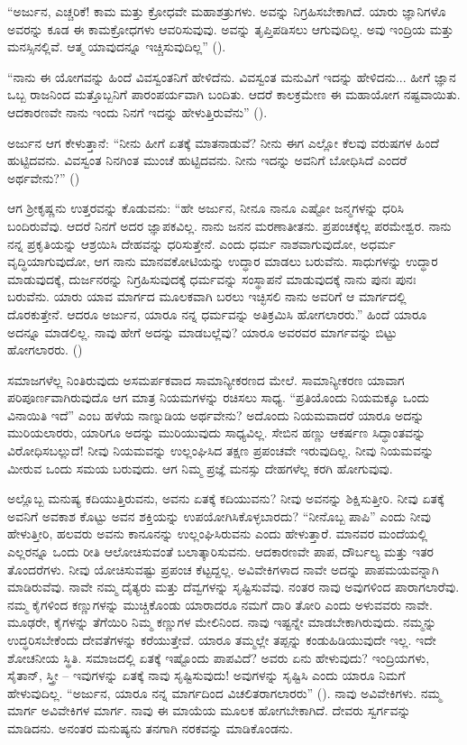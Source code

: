 “ಅರ್ಜುನ, ಎಚ್ಚರಿಕೆ! ಕಾಮ ಮತ್ತು ಕ್ರೋಧವೇ ಮಹಾಶತ್ರುಗಳು. ಅವನ್ನು ನಿಗ್ರಹಿಸಬೇಕಾಗಿದೆ. ಯಾರು ಜ್ಞಾನಿಗಳೊ ಅವರನ್ನು ಕೂಡ ಈ ಕಾಮಕ್ರೋಧಗಳು ಆವರಿಸುವುವು. ಅವನ್ನು ತೃಪ್ತಿಪಡಿಸಲು ಆಗುವುದಿಲ್ಲ. ಅವು ಇಂದ್ರಿಯ ಮತ್ತು ಮನಸ್ಸಿನಲ್ಲಿವೆ. ಆತ್ಮ ಯಾವುದನ್ನೂ ಇಚ್ಚಿಸುವುದಿಲ್ಲ” ().

“ನಾನು ಈ ಯೋಗವನ್ನು ಹಿಂದೆ ವಿವಸ್ವಂತನಿಗೆ ಹೇಳಿದೆನು. ವಿವಸ್ವಂತ ಮನುವಿಗೆ ಇದನ್ನು ಹೇಳಿದನು... ಹೀಗೆ ಜ್ಞಾನ ಒಬ್ಬ ರಾಜನಿಂದ ಮತ್ತೊಬ್ಬನಿಗೆ ಪಾರಂಪರ್ಯವಾಗಿ ಬಂದಿತು. ಆದರೆ ಕಾಲಕ್ರಮೇಣ ಈ ಮಹಾಯೋಗ ನಷ್ಟವಾಯಿತು. ಆದಕಾರಣವೇ ನಾನು ಇಂದು ನಿನಗೆ ಇದನ್ನು ಹೇಳುತ್ತಿರುವೆನು” ().

ಅರ್ಜುನ ಆಗ ಕೇಳುತ್ತಾನೆ: “ನೀನು ಹೀಗೆ ಏತಕ್ಕೆ ಮಾತನಾಡುವೆ? ನೀನು ಈಗ ಎಲ್ಲೋ ಕೆಲವು ವರುಷಗಳ ಹಿಂದೆ ಹುಟ್ಟಿದವನು. ವಿವಸ್ವಂತ ನಿನಗಿಂತ ಮುಂಚೆ ಹುಟ್ಟಿದವನು. ನೀನು ಇದನ್ನು ಅವನಿಗೆ ಬೋಧಿಸಿದೆ ಎಂದರೆ ಅರ್ಥವೇನು?” ()

ಆಗ ಶ‍್ರೀಕೃಷ್ಣನು ಉತ್ತರವನ್ನು ಕೊಡುವನು: “ಹೇ ಅರ್ಜುನ, ನೀನೂ ನಾನೂ ಎಷ್ಟೋ ಜನ್ಮಗಳನ್ನು ಧರಿಸಿ ಬಂದಿರುವೆವು. ಆದರೆ ನಿನಗೆ ಅದರ ಜ್ಞಾಪಕವಿಲ್ಲ. ನಾನು ಜನನ ಮರಣಾತೀತನು. ಪ್ರಪಂಚಕ್ಕೆಲ್ಲ ಪರಮೇಶ್ವರ. ನಾನು ನನ್ನ ಪ್ರಕೃತಿಯನ್ನು ಆಶ್ರಯಿಸಿ ದೇಹವನ್ನು ಧರಿಸುತ್ತೇನೆ. ಎಂದು ಧರ್ಮ ನಾಶವಾಗುವುದೋ, ಅಧರ್ಮ ವೃದ್ಧಿಯಾಗುವುದೋ, ಆಗ ನಾನು ಮಾನವಕೋಟಿಯನ್ನು ಉದ್ಧಾರ ಮಾಡಲು ಬರುವೆನು. ಸಾಧುಗಳನ್ನು ಉದ್ಧಾರ ಮಾಡುವುದಕ್ಕೆ, ದುರ್ಜನರನ್ನು ನಿಗ್ರಹಿಸುವುದಕ್ಕೆ ಧರ್ಮವನ್ನು ಸಂಸ್ಥಾಪನೆ ಮಾಡುವುದಕ್ಕೆ ನಾನು ಪುನಃ ಪುನಃ ಬರುವೆನು. ಯಾರು ಯಾವ ಮಾರ್ಗದ ಮೂಲಕವಾಗಿ ಬರಲು ಇಚ್ಛಿಸಲಿ ನಾನು ಅವರಿಗೆ ಆ ಮಾರ್ಗದಲ್ಲಿ ದೊರಕುತ್ತೇನೆ. ಆದರೂ ಅರ್ಜುನ, ಯಾರೂ ನನ್ನ ಧರ್ಮವನ್ನು ಅತಿಕ್ರಮಿಸಿ ಹೋಗಲಾರರು.” ಹಿಂದೆ ಯಾರೂ ಅದನ್ನೂ ಮಾಡಲಿಲ್ಲ. ನಾವು ಹೇಗೆ ಅದನ್ನು ಮಾಡಬಲ್ಲೆವು? ಯಾರೂ ಅವರವರ ಮಾರ್ಗವನ್ನು ಬಿಟ್ಟು ಹೋಗಲಾರರು. ()

ಸಮಾಜಗಳೆಲ್ಲ ನಿಂತಿರುವುದು ಅಸಮರ್ಪಕವಾದ ಸಾಮಾನ್ಯೀಕರಣದ ಮೇಲೆ. ಸಾಮಾನ್ಯೀಕರಣ ಯಾವಾಗ ಪರಿಪೂರ್ಣವಾಗಿರುವುದೊ ಆಗ ಮಾತ್ರ ನಿಯಮಗಳನ್ನು ರಚಿಸಲು ಸಾಧ್ಯ. “ಪ್ರತಿಯೊಂದು ನಿಯಮಕ್ಕೂ ಒಂದು ವಿನಾಯಿತಿ ಇದೆ” ಎಂಬ ಹಳೆಯ ನಾಣ್ನುಡಿಯ ಅರ್ಥವೇನು? ಅದೊಂದು ನಿಯಮವಾದರೆ ಯಾರೂ ಅದನ್ನು ಮುರಿಯಲಾರರು, ಯಾರಿಗೂ ಅದನ್ನು ಮುರಿಯುವುದು ಸಾಧ್ಯವಿಲ್ಲ. ಸೇಬಿನ ಹಣ್ಣು ಆಕರ್ಷಣ ಸಿದ್ಧಾಂತವನ್ನು ವಿರೋಧಿಸಬಲ್ಲುದೆ! ನೀವು ನಿಯಮವನ್ನು ಉಲ್ಲಂಘಿಸಿದ ತಕ್ಷಣ ಪ್ರಪಂಚವೇ ಇರುವುದಿಲ್ಲ. ನೀವು ನಿಯಮವನ್ನು ಮೀರುವ ಒಂದು ಸಮಯ ಬರುವುದು. ಆಗ ನಿಮ್ಮ ಪ್ರಜ್ಞೆ ಮನಸ್ಸು ದೇಹಗಳೆಲ್ಲ ಕರಗಿ ಹೋಗುವುವು.

ಅಲ್ಲೊಬ್ಬ ಮನುಷ್ಯ ಕದಿಯುತ್ತಿರುವನು, ಅವನು ಏತಕ್ಕೆ ಕದಿಯುವನು? ನೀವು ಅವನನ್ನು ಶಿಕ್ಷಿಸುತ್ತೀರಿ. ನೀವು ಏತಕ್ಕೆ ಅವನಿಗೆ ಅವಕಾಶ ಕೊಟ್ಟು ಅವನ ಶಕ್ತಿಯನ್ನು ಉಪಯೋಗಿಸಿಕೊಳ್ಳಬಾರದು? “ನೀನೊಬ್ಬ ಪಾಪಿ” ಎಂದು ನೀವು ಹೇಳುತ್ತೀರಿ, ಹಲವರು ಅವನು ಕಾನೂನನ್ನು ಉಲ್ಲಂಘಿಸಿರುವನು ಎಂದು ಹೇಳುತ್ತಾರೆ. ಮಾನವರ ಮಂದೆಯಲ್ಲಿ ಎಲ್ಲರನ್ನೂ ಒಂದು ರೀತಿ ಆಲೋಚಿಸುವಂತೆ ಬಲಾತ್ಕಾರಿಸುವನು. ಆದಕಾರಣವೇ ಪಾಪ, ದೌರ್ಬಲ್ಯ ಮತ್ತು ಇತರ ತೊಂದರೆಗಳು. ನೀವು ಯೋಚಿಸುವಷ್ಟು ಪ್ರಪಂಚ ಕೆಟ್ಟದ್ದಲ್ಲ. ಅವಿವೇಕಿಗಳಾದ ನಾವೇ ಅದನ್ನು ಪಾಪಮಯವನ್ನಾಗಿ ಮಾಡಿರುವೆವು. ನಾವೇ ನಮ್ಮ ದೈತ್ಯರು ಮತ್ತು ದೆವ್ವಗಳನ್ನು ಸೃಷ್ಟಿಸುವೆವು. ನಂತರ ನಾವು ಅವುಗಳಿಂದ ಪಾರಾಗಲಾರೆವು. ನಮ್ಮ ಕೈಗಳಿಂದ ಕಣ್ಣುಗಳನ್ನು ಮುಚ್ಚಿಕೊಂಡು ಯಾರಾದರೂ ನಮಗೆ ದಾರಿ ತೋರಿ ಎಂದು ಅಳುವವರು ನಾವೇ. ಮೂಢರೇ, ಕೈಗಳನ್ನು ತೆಗೆಯಿರಿ ನಿಮ್ಮ ಕಣ್ಣುಗಳ ಮೇಲಿನಿಂದ. ನಾವು ಇಷ್ಟನ್ನೇ ಮಾಡಬೇಕಾಗಿರುವುದು. ನಮ್ಮನ್ನು ಉದ್ಧರಿಸಬೇಕೆಂದು ದೇವತೆಗಳನ್ನು ಕರೆಯುತ್ತೇವೆ. ಯಾರೂ ತಮ್ಮಲ್ಲೇ ತಪ್ಪನ್ನು ಕಂಡುಹಿಡಿಯುವುದೇ ಇಲ್ಲ. ಇದೇ ಶೋಚನೀಯ ಸ್ಥಿತಿ. ಸಮಾಜದಲ್ಲಿ ಏತಕ್ಕೆ ಇಷ್ಟೊಂದು ಪಾಪವಿದೆ? ಅವರು ಏನು ಹೇಳುವುದು? ಇಂದ್ರಿಯಗಳು, ಸೈತಾನ್​, ಸ್ತ್ರೀ – ಇವುಗಳನ್ನು ಏತಕ್ಕೆ ನಾವು ಸೃಷ್ಟಿಸುವುದು! ಅವುಗಳನ್ನು ಸೃಷ್ಟಿಸಿ ಎಂದು ಯಾರೂ ನಿಮಗೆ ಹೇಳುವುದಿಲ್ಲ. “ಅರ್ಜುನ, ಯಾರೂ ನನ್ನ ಮಾರ್ಗದಿಂದ ವಿಚಲಿತರಾಗಲಾರರು” (). ನಾವು ಅವಿವೇಕಿಗಳು. ನಮ್ಮ ಮಾರ್ಗ ಅವಿವೇಕಿಗಳ ಮಾರ್ಗ. ನಾವು ಈ ಮಾಯೆಯ ಮೂಲಕ ಹೋಗಬೇಕಾಗಿದೆ. ದೇವರು ಸ್ವರ್ಗವನ್ನು ಮಾಡಿದನು. ಅನಂತರ ಮನುಷ್ಯನು ತನಗಾಗಿ ನರಕವನ್ನು ಮಾಡಿಕೊಂಡನು.

